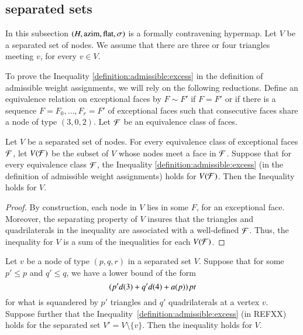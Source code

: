 \subsection{separated sets} %
\label{sec:2.7} \label{sec:tri34}

In this subsection $(H,{\operatorname{azim}},\operatorname{flat},\sigma)$ is a formally
contravening hypermap.  Let $V$ be a separated set of nodes.  We
assume that there are three or four triangles meeting $v$, for every
$v\in V$.

To prove the Inequality \ref{definition:admissible:excess} in the
definition of admissible weight assignments, we will rely on the
following reductions. Define an equivalence relation on exceptional
faces by $F\sim F'$ if $F=F'$ or if there is a sequence
$F=F_0,\ldots, F_r=F'$ of exceptional faces such that consecutive
faces share a node of type $(3,0,2)$. Let ${\cal F}$ be an
equivalence class of faces.


\begin{lemma} Let $V$ be a separated set of nodes.  For every
equivalence class of exceptional faces $\cal F$, let $V({\cal F})$
be the subset of $V$ whose nodes meet a face in ${\cal F}$. Suppose
that for every equivalence class $\cal F$, the Inequality
\ref{definition:admissible:excess} (in the definition of admissible
weight assignments) holds for $V({\cal F})$. Then the Inequality
holds for $V$.
\end{lemma}

\begin{proof}
By construction, each node in $V$ lies in some $F$, for an
exceptional face.  Moreover, the separating property of $V$ insures
that the triangles and quadrilaterals in the inequality are
associated with a well-defined  ${\cal F}$. Thus, the inequality for
$V$ is a sum of the inequalities for each $V({\cal F})$.
\end{proof}


\begin{lemma}
\label{lemma:split}
 Let $v$ be a node of type $(p,q,r)$ in a separated set $V$.  Suppose that
for some $p'\le p$ and $q'\le q$, we have a lower bound of the form
    $$( p' d(3) + q' d(4) + a(p))\,\hbox{\it pt}$$
for what is squandered by $p'$ triangles and $q'$ quadrilaterals at 
a vertex $v$.  Suppose further that the
Inequality~\ref{definition:admissible:excess} (in REFXX) holds for
the separated set $V' = V\setminus \{v\}$. Then the inequality holds
for $V$.
\end{lemma}

